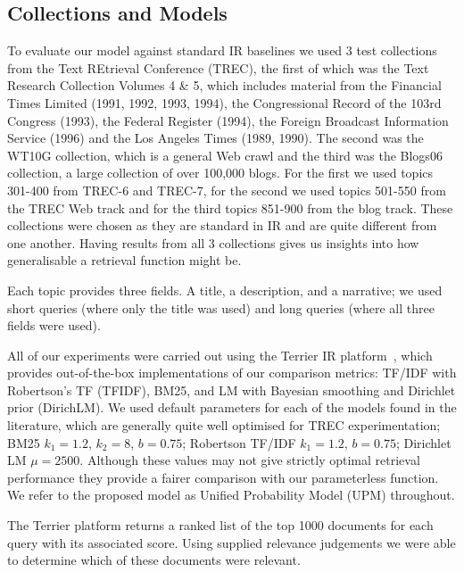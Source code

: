 \subsection{Collections and Models}
To evaluate our model against standard IR baselines we used 3 test collections from the Text REtrieval Conference (TREC), the first of which was the Text Research Collection Volumes 4 \& 5, which includes material from the Financial Times Limited (1991, 1992, 1993, 1994), the Congressional Record of the 103rd Congress (1993), the Federal Register (1994), the Foreign Broadcast Information Service (1996) and the Los Angeles Times (1989, 1990). The second was the WT10G collection, which is a general Web crawl and the third was the Blogs06 collection, a large collection of over 100,000 blogs.  For the first we used topics 301-400 from TREC-6 and TREC-7, for the second we used topics 501-550 from the TREC Web track and for the third topics 851-900 from the blog track. These collections were chosen as they are standard in IR and are quite different from one another. Having results from all 3 collections gives us insights into how generalisable a retrieval function might be.

Each topic provides three fields.  A title, a description, and a narrative; we used short queries (where only the title was used) and long queries (where all three fields were used).

All of our experiments were carried out using the Terrier IR platform~\cite{terrier}, which provides out-of-the-box implementations of our comparison metrics: TF/IDF with Robertson's TF (TFIDF), BM25, and LM with Bayesian smoothing and Dirichlet prior (DirichLM). We used default parameters for each of the models found in the literature, which are generally quite well optimised for TREC experimentation; BM25 $k_1=1.2$, $k_2=8$, $b=0.75$; Robertson TF/IDF $k_1=1.2$, $b=0.75$; Dirichlet LM $\mu=2500$. Although these values may not give strictly optimal retrieval performance they provide a fairer comparison with our parameterless function. We refer to the proposed model as Unified Probability Model (UPM) throughout.

The Terrier platform returns a ranked list of the top 1000 documents for each query with its associated score. Using supplied relevance judgements we were able to determine which of these documents were relevant.

